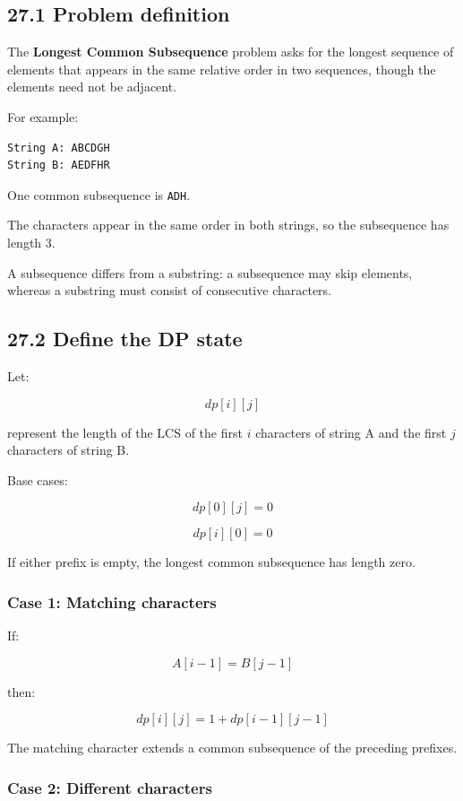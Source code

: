 \subsection{27.1 Problem definition}

The \textbf{Longest Common Subsequence} problem asks for the longest sequence of elements that appears in the same relative order in two sequences, though the elements need not be adjacent.

For example:

\begin{lstlisting}[style=pseudocode]
String A: ABCDGH
String B: AEDFHR
\end{lstlisting}

One common subsequence is \texttt{ADH}.

The characters appear in the same order in both strings, so the subsequence has length 3.

A subsequence differs from a substring: a subsequence may skip elements, whereas a substring must consist of consecutive characters.

\subsection{27.2 Define the DP state}

Let:


\[
dp[i][j]
\]


represent the length of the LCS of the first $i$ characters of string A and the first $j$ characters of string B.

Base cases:


\[
dp[0][j]=0
\]



\[
dp[i][0]=0
\]


If either prefix is empty, the longest common subsequence has length zero.

\subsubsection{Case 1: Matching characters}

If:


\[
A[i-1]=B[j-1]
\]


then:


\[
\boxed{dp[i][j]=1+dp[i-1][j-1]}
\]


The matching character extends a common subsequence of the preceding prefixes.

\subsubsection{Case 2: Different characters}

